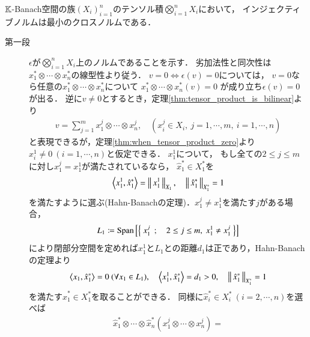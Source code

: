 	\begin{screen}
		\begin{thm}[インジェクティブノルムは最小のクロスノルム]
		\label{thm:injective_norm_is_the_minimum_cross_norm}
			$\mathbb{K}$-Banach空間の族$(X_i)_{i=1}^n$のテンソル積$\bigotimes_{i=1}^{n} X_i$において，
			インジェクティブノルムは最小のクロスノルムである．
		\end{thm}
	\end{screen}
	
	\begin{prf}\mbox{}
		\begin{description}
			\item[第一段]
				$\epsilon$が$\bigotimes_{i=1}^{n} X_i$上のノルムであることを示す．
				劣加法性と同次性は$x_1^* \otimes \cdots \otimes x_n^*$の線型性より従う．
				$v = 0 \Leftrightarrow \epsilon(v) = 0$については，
				$v = 0$なら任意の$x_1^* \otimes \cdots \otimes x_n^*$について
				$x_1^* \otimes \cdots \otimes x_n^* (v) = 0$
				が成り立ち$\epsilon(v) = 0$が出る．
				逆に$v \neq 0$とするとき，定理\ref{thm:tensor_product_is_bilinear}より
				\begin{align}
					v = \sum_{j=1}^{m} x^j_1 \otimes \cdots \otimes x^j_n,
					\quad (x^j_i \in X_i,\ j=1,\cdots,m,\ i=1,\cdots,n)
				\end{align}
				と表現できるが，定理\ref{thm:when_tensor_product_zero}より
				$x^1_i \neq 0\ (i=1,\cdots,n)$と仮定できる．
				$x^1_1$について，
				もし全ての$2 \leq j \leq m$に対し$x^j_1 = x^1_1$が満たされているなら，
				$\hat{x}_1^* \in X_1^*$を
				\begin{align}
					\inprod<x^1_1, \hat{x}_1^*> = \Norm{x^1_1}{X_1},
					\quad \Norm{\hat{x}_1^*}{X^*_1} = 1
				\end{align}
				を満たすように選ぶ(Hahn-Banachの定理)．$x^j_1 \neq x^1_1$を満たす$j$がある場合，
				\begin{align}
					L_1 \coloneqq \Span{\Set{x^j_1}{2 \leq j \leq m,\ x^1_1 \neq x^j_1}}
				\end{align}
				により閉部分空間を定めれば$x^1_1$と$L_1$との距離$d_1$は正であり，Hahn-Banachの定理より
				\begin{align}
					\inprod<x_1,\hat{x}_1^*> = 0\ (\forall x_1 \in L_1),
					\quad \inprod<x^1_1,\hat{x}_1^*> = d_1 > 0,
					\quad \Norm{\hat{x}_1^*}{X_1^*} = 1
				\end{align}
				を満たす$\hat{x}_1^* \in X_1^*$を取ることができる．
				同様に$\hat{x}_i^* \in X_i^*\ (i=2,\cdots,n)$を選べば
				\begin{align}
					\hat{x}_1^* \otimes \cdots \otimes \hat{x}_n^*(x^j_1 \otimes \cdots \otimes x^j_n) =

\end{align}
\end{description}
\end{prf}
